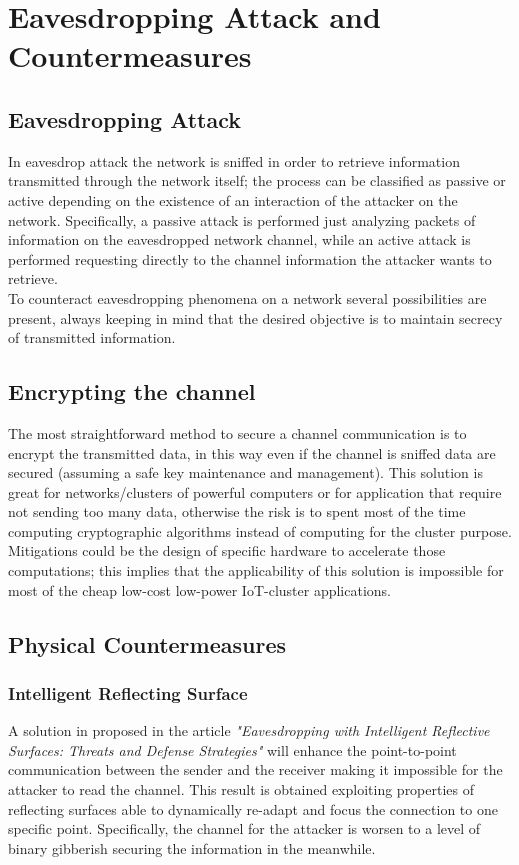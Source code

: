 \section{Eavesdropping Attack and Countermeasures}
\subsection{Eavesdropping Attack}
In eavesdrop attack the network is sniffed in order to retrieve information transmitted through the network itself; the process can be classified as passive or active depending on the existence of an interaction of the attacker on the network. Specifically, a passive attack is performed just analyzing packets of information on the eavesdropped network channel, while an active attack is performed requesting directly to the channel information the attacker wants to retrieve.\\
To counteract eavesdropping phenomena on a network several possibilities are present, always keeping in mind that the desired objective is to maintain secrecy of transmitted information.

\subsection{Encrypting the channel}
The most straightforward method to secure a channel communication is to encrypt the transmitted data, in this way even if the channel is sniffed data are secured (assuming a safe key maintenance and management). This solution is great for networks/clusters of powerful computers or for application that require not sending too many data, otherwise the risk is to spent most of the time computing cryptographic algorithms instead of computing for the cluster purpose. Mitigations could be the design of specific hardware to accelerate those computations; this implies that the applicability of this solution is impossible for most of the cheap low-cost low-power IoT-cluster applications.

\subsection{Physical Countermeasures}
\subsubsection{Intelligent Reflecting Surface}
A solution in proposed in the article \textit{"Eavesdropping with Intelligent Reflective Surfaces: Threats and Defense Strategies"}\cite{https://doi.org/10.48550/arxiv.2108.00149} will enhance the point-to-point communication between the sender and the receiver making it impossible for the attacker to read the channel. This result is obtained exploiting properties of reflecting surfaces able to dynamically re-adapt and focus the connection to one specific point. Specifically, the channel for the attacker is worsen to a level of binary gibberish securing the information in the meanwhile.
